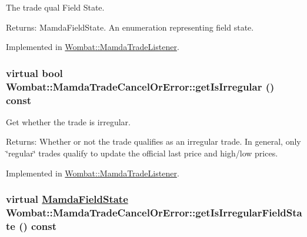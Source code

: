 The trade qual Field State. 

\begin{Desc}
\item[Returns:]Mamda\-Field\-State. An enumeration representing field state. \end{Desc}


Implemented in \hyperlink{classWombat_1_1MamdaTradeListener_958ea55776c3afa0a572b8819d9c04c8}{Wombat::Mamda\-Trade\-Listener}.\hypertarget{classWombat_1_1MamdaTradeCancelOrError_a066daf6f361384f809a91dd4085149e}{
\subsubsection[getIsIrregular]{\setlength{\rightskip}{0pt plus 5cm}virtual bool Wombat::Mamda\-Trade\-Cancel\-Or\-Error::get\-Is\-Irregular () const}}
\label{classWombat_1_1MamdaTradeCancelOrError_a066daf6f361384f809a91dd4085149e}


Get whether the trade is irregular. 

\begin{Desc}
\item[Returns:]Whether or not the trade qualifies as an irregular trade. In general, only \char`\"{}regular\char`\"{} trades qualify to update the official last price and high/low prices. \end{Desc}


Implemented in \hyperlink{classWombat_1_1MamdaTradeListener_1a5b54d3d63c62bf8720cc29dd40b25a}{Wombat::Mamda\-Trade\-Listener}.\hypertarget{classWombat_1_1MamdaTradeCancelOrError_f44398c02c719db7a0f706a177590297}{
\subsubsection[getIsIrregularFieldState]{\setlength{\rightskip}{0pt plus 5cm}virtual \hyperlink{namespaceWombat_93aac974f2ab713554fd12a1fa3b7d2a}{Mamda\-Field\-State} Wombat::Mamda\-Trade\-Cancel\-Or\-Error::get\-Is\-Irregular\-Field\-State () const}}
\label{classWombat_1_1MamdaTradeCancelOrError_f44398c02c719db7a0f706a177590297}


